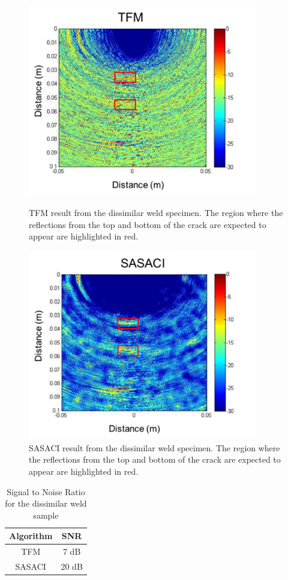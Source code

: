 \begin{figure}[p!]
\centering
		\includegraphics[width=100mm]{TWI2_1.png}
		\caption{TFM result from the dissimilar weld specimen. The region where the reflections from the top and bottom of the crack are expected to appear are highlighted in red.}
		\label{fig:TWI2}

		\includegraphics[width=100mm]{TWI3_1.png}
		\caption{SASACI result from the dissimilar weld specimen. The region where the reflections from the top and bottom of the crack are expected to appear are highlighted in red.}
		\label{fig:TWI3}
\end{figure}

\begin{table}[h!]
\begin{center}
	\begin{tabular}{| c | c |}
	\hline 
	\textbf{Algorithm} & \textbf{SNR} \\ \hline \hline 
	TFM	& 7 dB\\ \hline
	SASACI & 20 dB\\ \hline
	\end{tabular}
	\caption{Signal to Noise Ratio for the dissimilar weld sample}
	\label{table:twi}
	\end{center}
	\end{table}

